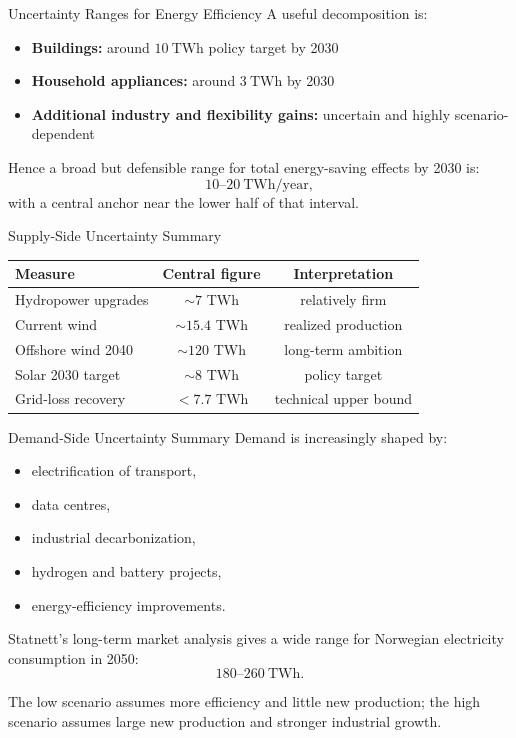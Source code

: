 \documentclass[aspectratio=169]{beamer}
\begin{document}
\begin{frame}{Uncertainty Ranges for Energy Efficiency}
A useful decomposition is:
\begin{itemize}
    \item \textbf{Buildings:} around \(10\ \text{TWh}\) policy target by 2030
    \item \textbf{Household appliances:} around \(3\ \text{TWh}\) by 2030
    \item \textbf{Additional industry and flexibility gains:} uncertain and highly scenario-dependent
\end{itemize}

\medskip

Hence a broad but defensible range for total energy-saving effects by 2030 is:
\[
10\text{--}20\ \text{TWh/year},
\]
with a central anchor near the lower half of that interval.
\end{frame}

\begin{frame}{Supply-Side Uncertainty Summary}
\begin{center}
\begin{tabular}{lcc}
\toprule
Measure & Central figure & Interpretation \\
\midrule
Hydropower upgrades & \(\sim 7\) TWh & relatively firm \\
Current wind & \(\sim 15.4\) TWh & realized production \\
Offshore wind 2040 & \(\sim 120\) TWh & long-term ambition \\
Solar 2030 target & \(\sim 8\) TWh & policy target \\
Grid-loss recovery & \(< 7.7\) TWh & technical upper bound \\
\bottomrule
\end{tabular}
\end{center}
\end{frame}

\begin{frame}{Demand-Side Uncertainty Summary}
Demand is increasingly shaped by:
\begin{itemize}
    \item electrification of transport,
    \item data centres,
    \item industrial decarbonization,
    \item hydrogen and battery projects,
    \item energy-efficiency improvements.
\end{itemize}

\medskip

Statnett's long-term market analysis gives a wide range for Norwegian electricity consumption in 2050:
\[
180\text{--}260\ \text{TWh}.
\]

The low scenario assumes more efficiency and little new production; the high scenario assumes large new production and stronger industrial growth.
\end{frame}
\end{document}
